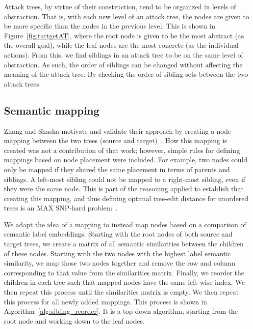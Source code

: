 Attack trees, by virtue of their construction, tend to be organized in levels of abstraction. That is, with each new level of an attack tree, the nodes are given to be more specific than the nodes in the previous level. This is shown in Figure~\ref{fig:tartgetAT}, where the root node is given to be the most abstract (as the overall goal), while the leaf nodes are the most concrete (as the individual actions). From this, we find siblings in an attack tree to be on the same level of abstraction. As such, the order of siblings can be changed without affecting the meaning of the attack tree. By checking the order of sibling sets between the two attack trees




\subsection{Semantic mapping}

Zhang and Shasha motivate and validate their approach by creating a node mapping between the two trees (source and target)~\cite{zhang_simple_1989}. How this mapping is created was not a contribution of that work; however, simple rules for defining mappings based on node placement were included. For example, two nodes could only be mapped if they shared the same placement in terms of parents and siblings. A left-most sibling could not be mapped to a right-most sibling, even if they were the same node. This is part of the reasoning applied to establish that creating this mapping, and thus defining optimal tree-edit distance for unordered trees is an MAX SNP-hard problem~\cite{zhangMAXSNPhardResults1994}.

We adapt the idea of a mapping to instead map nodes based on a comparison of semantic label embeddings. Starting with the root nodes of both source and target trees, we create a matrix of all semantic similarities between the children of these nodes. Starting with the two nodes with the highest label semantic similarity, we map those two nodes together and remove the row and column corresponding to that value from the similarities matrix. Finally, we reorder the children in each tree such that mapped nodes have the same left-wise index. We then repeat this process until the similarities matrix is empty. We then repeat this process for all newly added mappings. This process is shown in Algorithm~\ref{alg:sibling_reorder}. It is a top down algorithm, starting from the root node and working down to the leaf nodes.

